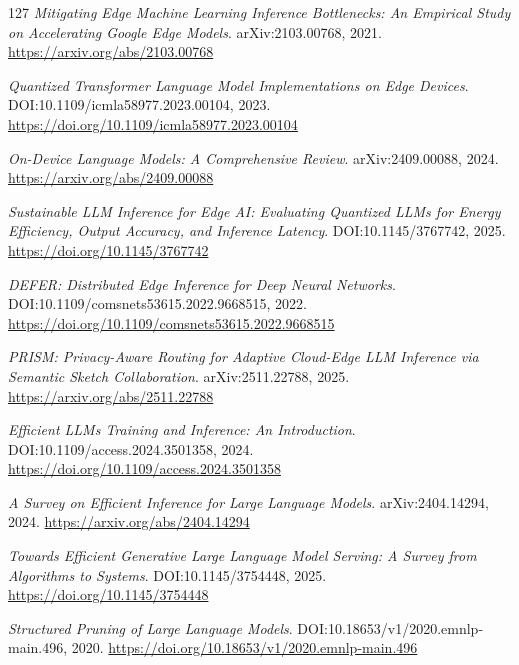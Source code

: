 \documentclass[11pt,a4paper]{article}
\begin{document}
\begin{thebibliography}{127}
\newblock \emph{Mitigating Edge Machine Learning Inference Bottlenecks: An Empirical Study on Accelerating Google Edge Models}.
\newblock arXiv:2103.00768, 2021.
\newblock \url{https://arxiv.org/abs/2103.00768}

\newblock \emph{Quantized Transformer Language Model Implementations on Edge Devices}.
\newblock DOI:10.1109/icmla58977.2023.00104, 2023.
\newblock \url{https://doi.org/10.1109/icmla58977.2023.00104}

\newblock \emph{On-Device Language Models: A Comprehensive Review}.
\newblock arXiv:2409.00088, 2024.
\newblock \url{https://arxiv.org/abs/2409.00088}

\newblock \emph{Sustainable LLM Inference for Edge AI: Evaluating Quantized LLMs for Energy Efficiency, Output Accuracy, and Inference Latency}.
\newblock DOI:10.1145/3767742, 2025.
\newblock \url{https://doi.org/10.1145/3767742}

\newblock \emph{DEFER: Distributed Edge Inference for Deep Neural Networks}.
\newblock DOI:10.1109/comsnets53615.2022.9668515, 2022.
\newblock \url{https://doi.org/10.1109/comsnets53615.2022.9668515}

\newblock \emph{PRISM: Privacy-Aware Routing for Adaptive Cloud-Edge LLM Inference via Semantic Sketch Collaboration}.
\newblock arXiv:2511.22788, 2025.
\newblock \url{https://arxiv.org/abs/2511.22788}

\newblock \emph{Efficient LLMs Training and Inference: An Introduction}.
\newblock DOI:10.1109/access.2024.3501358, 2024.
\newblock \url{https://doi.org/10.1109/access.2024.3501358}

\newblock \emph{A Survey on Efficient Inference for Large Language Models}.
\newblock arXiv:2404.14294, 2024.
\newblock \url{https://arxiv.org/abs/2404.14294}

\newblock \emph{Towards Efficient Generative Large Language Model Serving: A Survey from Algorithms to Systems}.
\newblock DOI:10.1145/3754448, 2025.
\newblock \url{https://doi.org/10.1145/3754448}

\newblock \emph{Structured Pruning of Large Language Models}.
\newblock DOI:10.18653/v1/2020.emnlp-main.496, 2020.
\newblock \url{https://doi.org/10.18653/v1/2020.emnlp-main.496}


\end{thebibliography}
\end{document}

